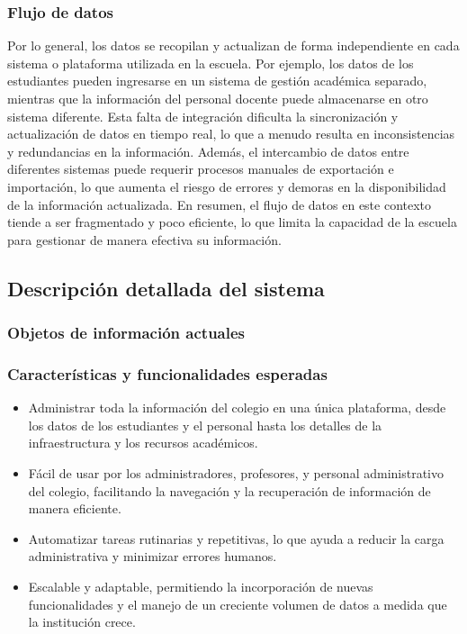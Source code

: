 \subsubsection{Flujo de datos}
Por lo general, los datos se recopilan y actualizan de forma independiente en cada sistema o plataforma utilizada en la escuela. Por ejemplo, los datos de los estudiantes pueden ingresarse en un sistema de gestión académica separado, mientras que la información del personal docente puede almacenarse en otro sistema diferente. Esta falta de integración dificulta la sincronización y actualización de datos en tiempo real, lo que a menudo resulta en inconsistencias y redundancias en la información. Además, el intercambio de datos entre diferentes sistemas puede requerir procesos manuales de exportación e importación, lo que aumenta el riesgo de errores y demoras en la disponibilidad de la información actualizada. En resumen, el flujo de datos en este contexto tiende a ser fragmentado y poco eficiente, lo que limita la capacidad de la escuela para gestionar de manera efectiva su información.
\subsection{Descripción detallada del sistema}
\subsubsection{Objetos de información actuales}
\subsubsection{Características y funcionalidades esperadas}
\begin{itemize}
	\item Administrar toda la información del colegio en una única plataforma, desde los datos de los estudiantes y el personal hasta los detalles de la infraestructura y los recursos académicos.
	\item Fácil de usar por los administradores, profesores, y personal administrativo del colegio, facilitando la navegación y la recuperación de información de manera eficiente.
	\item Automatizar tareas rutinarias y repetitivas, lo que ayuda a reducir la carga administrativa y minimizar errores humanos.
	\item Escalable y adaptable, permitiendo la incorporación de nuevas funcionalidades y el manejo de un creciente volumen de datos a medida que la institución crece.
\end{itemize}
